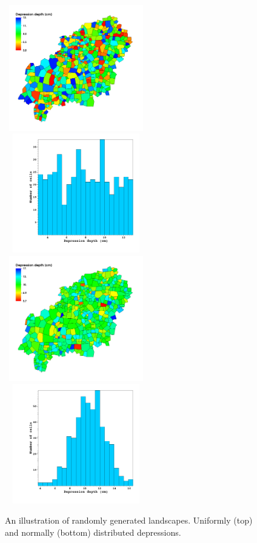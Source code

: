 \documentclass[review,11pt]{elsarticle}
\begin{document}
\begin{figure}[!h]
\centering
\includegraphics[width=6.2cm, height=5.5cm]{./figures/DeprDepth/Mrun1SG.png}
\includegraphics[width=6.2cm, height=5.2cm]{./figures/DeprDepth/Mrun1SG-Hist.png} \\
\includegraphics[width=6.2cm, height=5.5cm]{./figures/DeprDepth/Mrun4SG.png}
\includegraphics[width=6.2cm, height=5.2cm]{./figures/DeprDepth/Mrun4SG-Hist.png} \\
\caption{An illustration of randomly generated landscapes. Uniformly (top) and normally (bottom) distributed depressions.}
\label{hetero-sg-parameters}
\end{figure}
\end{document}
